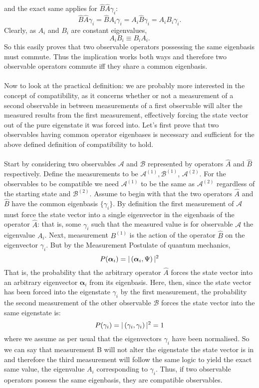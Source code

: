 and the exact same applies for $\hat{B}\hat{A}\gamma_{i}$:
$$
\hat{B}\hat{A}\gamma_{i}=\hat{B}A_{i}\gamma_{i}=A_{i}\hat{B}\gamma_{i}=A_{i}B_{i}\gamma_{i}.
$$
Clearly, as $A_{i}$ and $B_{i}$ are constant eigenvalues, 
$$
A_{i}B_{i}\equiv B_{i}A_{i}.
$$
So this easily proves that two observable operators possessing the same eigenbasis must commute. Thus the implication works both ways and therefore two observable operators commute iff they share a common eigenbasis.
\\\\
Now to look at the practical definition: we are probably more interested in the concept of compatibility, as it concerns whether or not a measurement of a second observable in between measurements of a first observable will alter the measured results from the first measurement, effectively  forcing the state vector out of the pure eigenstate it was forced into. Let's first prove that two observables having common operator eigenbases is necessary and sufficient for the above defined definition of compatibility to hold.
\\\\
Start by considering two observables $\mathcal{A}$ and $\mathcal{B}$ represented by operators $\hat{A}$ and $\hat{B}$ respectively. Define the measurements to be $\mathcal{A}^{(1)},\mathcal{B}^{(1)}$, $\mathcal{A}^{(2)}$. For the observables to be compatible we need $\mathcal{A}^{(1)}$ to be the same as $\mathcal{A}^{(2)}$ regardless of the starting state and $\mathcal{B}^{(2)}$. Assume to begin with that the two operators $\hat{A}$ and $\hat{B}$ have the common eigenbasis $\{\gamma_{i}\}$. By definition the first measurement of $\mathcal{A}$ must force the state vector into a single eigenvector in the eigenbasis of the operator $\hat{A}$: that is, some $\gamma_{i}$ such that the measured value is for observable $\mathcal{A}$ the eigenvalue $A_{i}$. Next, measurement ${{B}}^{(1)}$ is the action of the operator $\hat{B}$ on the eigenvector $\gamma_{i}$. But by the Measurement Postulate of quantum mechanics,
$$
P(\bm{\alpha}_{i})=|\left(\bm{\alpha}_{i},\Psi\right)|^2
$$
That is, the probability that the arbitrary operator $\hat{A}$ forces the state vector into an arbitrary eigenvector $\bm{\alpha}_{i}$ from its eigenbasis. Here, then, since the state vector has been forced into the eigenstate $\gamma_{i}$ by the first measurement, the probability the second measurement of the other observable $\mathcal{B}$ forces the state vector into the same eigenstate is:
$$
P(\gamma_{i})=|\left(\gamma_{i},\gamma_{i}\right)|^2=1
$$
where we assume as per usual that the eigenvectors $\gamma_{i}$ have been normalised. So we can say that measurement B will not alter the eigenstate the state vector is in and therefore the third measurement will follow the same logic to yield the exact same value, the eigenvalue $A_{i}$ corresponding to $\gamma_{i}$. Thus, if two observable operators possess the same eigenbasis, they are compatible observables.
